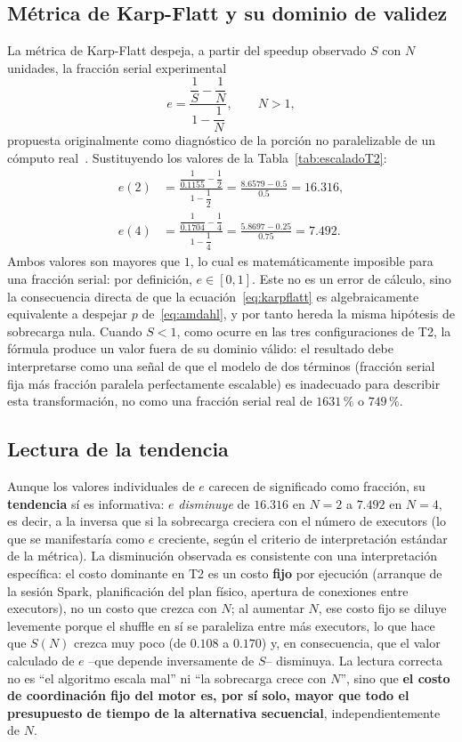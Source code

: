 \documentclass[10pt,journal]{IEEEtran}
\begin{document}
\subsection{M\'etrica de Karp-Flatt y su dominio de validez}
La m\'etrica de Karp-Flatt despeja, a partir del speedup observado $S$ con
$N$ unidades, la fracci\'on serial experimental
\begin{equation}
e = \frac{\dfrac{1}{S} - \dfrac{1}{N}}{1 - \dfrac{1}{N}}, \qquad N>1,
\label{eq:karpflatt}
\end{equation}
propuesta originalmente como diagn\'ostico de la porci\'on no paralelizable
de un c\'omputo real~\cite{karpflatt1990}. Sustituyendo los valores de la
Tabla~\ref{tab:escaladoT2}:
\begin{align}
e(2) &= \frac{\dfrac{1}{0.1155} - \dfrac{1}{2}}{1 - \dfrac{1}{2}}
       = \frac{8.6579 - 0.5}{0.5} = 16.316,\\
e(4) &= \frac{\dfrac{1}{0.1704} - \dfrac{1}{4}}{1 - \dfrac{1}{4}}
       = \frac{5.8697 - 0.25}{0.75} = 7.492.
\label{eq:karpflatt_num}
\end{align}
Ambos valores son mayores que $1$, lo cual es matem\'aticamente imposible
para una fracci\'on serial: por definici\'on, $e \in [0,1]$. Este no es un
error de c\'alculo, sino la consecuencia directa de que la
ecuaci\'on~\eqref{eq:karpflatt} es algebraicamente equivalente a despejar $p$
de~\eqref{eq:amdahl}, y por tanto hereda la misma hip\'otesis de sobrecarga
nula. Cuando $S<1$, como ocurre en las tres configuraciones de T2, la
f\'ormula produce un valor fuera de su dominio v\'alido: el resultado debe
interpretarse como una se\~nal de que el modelo de dos t\'erminos (fracci\'on
serial fija m\'as fracci\'on paralela perfectamente escalable) es inadecuado
para describir esta transformaci\'on, no como una fracci\'on serial real de
$1631\,\%$ o $749\,\%$.

\subsection{Lectura de la tendencia}
Aunque los valores individuales de $e$ carecen de significado como fracci\'on,
su \textbf{tendencia} s\'i es informativa: $e$ \emph{disminuye} de $16.316$ en
$N=2$ a $7.492$ en $N=4$, es decir, a la inversa que si la sobrecarga
creciera con el n\'umero de executors (lo que se manifestar\'ia como $e$
creciente, seg\'un el criterio de interpretaci\'on est\'andar de la
m\'etrica). La disminuci\'on observada es consistente con una interpretaci\'on
espec\'ifica: el costo dominante en T2 es un costo \textbf{fijo} por
ejecuci\'on (arranque de la sesi\'on Spark, planificaci\'on del plan f\'isico,
apertura de conexiones entre executors), no un costo que crezca con $N$; al
aumentar $N$, ese costo fijo se diluye levemente porque el shuffle en s\'i se
paraleliza entre m\'as executors, lo que hace que $S(N)$ crezca muy poco
(de $0.108$ a $0.170$) y, en consecuencia, que el valor calculado de $e$
--que depende inversamente de $S$-- disminuya. La lectura correcta no es
``el algoritmo escala mal'' ni ``la sobrecarga crece con $N$'', sino que
\textbf{el costo de coordinaci\'on fijo del motor es, por s\'i solo, mayor que
todo el presupuesto de tiempo de la alternativa secuencial}, independientemente
de $N$.
\end{document}
